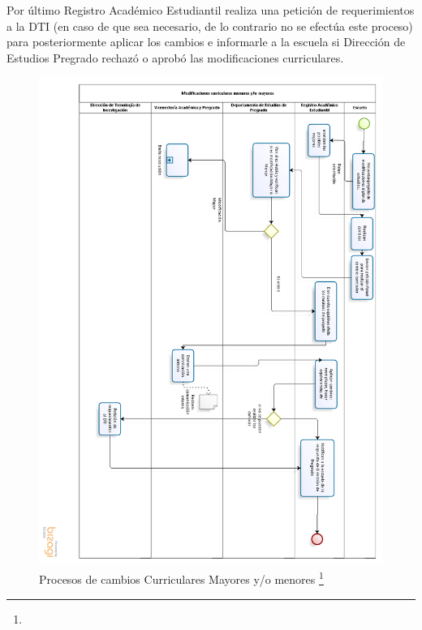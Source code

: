 				Por último Registro Académico Estudiantil realiza una petición de requerimientos a la DTI (en caso de que sea necesario, de lo contrario no se efectúa este proceso) para posteriormente aplicar los cambios e informarle a la escuela si Dirección de Estudios Pregrado rechazó o aprobó las modificaciones curriculares.
		\begin{figure}[H]
			\centering
			\includegraphics[width=1\textwidth]{images/Capitulo_1/Procesos_cambios_curriculares.png}
			\caption[Procesos de cambios Curriculares Mayores y/o menores ]{Procesos de cambios Curriculares Mayores y/o menores  \footnote{}}
			\label{Figura2}
		\end{figure}
		
		

		
		
		\newpage
		
